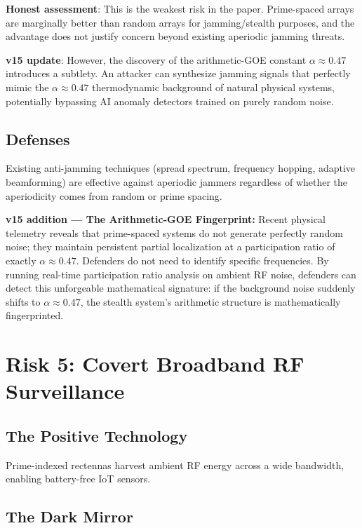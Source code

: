 \documentclass[11pt,a4paper]{article}
\begin{document}
\textbf{Honest assessment}: This is the weakest risk in the paper.
Prime-spaced arrays are marginally better than random arrays for
jamming/stealth purposes, and the advantage does not justify
concern beyond existing aperiodic jamming threats.

\textbf{v15 update}: However, the discovery of the arithmetic-GOE
constant $\alpha \approx 0.47$ introduces a subtlety. An attacker can
synthesize jamming signals that perfectly mimic the $\alpha \approx 0.47$
thermodynamic background of natural physical systems, potentially
bypassing AI anomaly detectors trained on purely random noise.

\subsection{Defenses}

Existing anti-jamming techniques (spread spectrum, frequency
hopping, adaptive beamforming) are effective against aperiodic
jammers regardless of whether the aperiodicity comes from random
or prime spacing.

\textbf{v15 addition --- The Arithmetic-GOE Fingerprint:}
Recent physical telemetry reveals that prime-spaced systems do not
generate perfectly random noise; they maintain persistent partial
localization at a participation ratio of exactly $\alpha \approx 0.47$.
Defenders do not need to identify specific frequencies.
By running real-time participation ratio analysis on ambient RF noise,
defenders can detect this unforgeable mathematical signature: if the
background noise suddenly shifts to $\alpha \approx 0.47$, the stealth
system's arithmetic structure is mathematically fingerprinted.

\section{Risk 5: Covert Broadband RF Surveillance}
\label{sec:surveillance}

\subsection{The Positive Technology}

Prime-indexed rectennas harvest ambient RF energy across a wide
bandwidth, enabling battery-free IoT sensors.

\subsection{The Dark Mirror}
\end{document}
